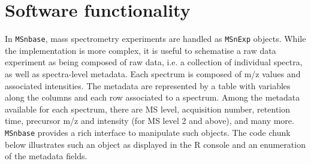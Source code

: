 \documentclass[journal=jacsat,manuscript=article]{achemso}\usepackage[]{graphicx}\usepackage[]{color}
\begin{document}
\section{Software functionality}

In \texttt{MSnbase}, mass spectrometry experiments are handled as
\texttt{MSnExp} objects. While the implementation is more complex, it
is useful to schematise a raw data experiment as being composed of raw
data, i.e. a collection of individual spectra, as well as
spectra-level metadata. Each spectrum is composed of m/z values and
associated intensities. The metadata are represented by a table with
variables along the columns and each row associated to a
spectrum. Among the metadata available for each spectrum, there are MS
level, acquisition number, retention time, precursor m/z and intensity
(for MS level 2 and above), and many more. \texttt{MSnbase} provides a
rich interface to manipulate such objects. The code chunk below
illustrates such an object as displayed in the R console and an
enumeration of the metadata fields.
\end{document}
